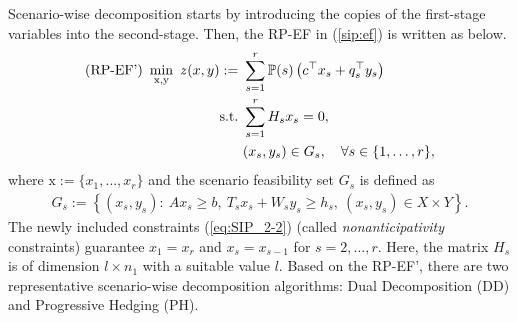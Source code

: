Scenario-wise decomposition starts by introducing the copies of the first-stage variables into the second-stage. Then, the RP-EF in (\ref{sip:ef}) is written as below.
\begin{subequations} \label{sip:ef'}
	\begin{align}
	\textrm{(RP-EF') }\min_{\mathrm{x},\mathrm{y}}\ z(x,y):=\ &\sum_{s=1}^{r}\PP(s)\left(c^{\top}x_s+q_s^{\top}y_s\right)	\label{eq:SIP_2-1}\\ 
	\mathrm{s.t.}\ &\sum_{s=1}^{r}H_s x_s=0, \label{eq:SIP_2-2} \\
	\ &(x_s,y_s)\in G_s,\quad \forall s\in\{1,\ldots,r\},	\label{eq:SIP_2-3}
	\end{align}
\end{subequations}
where $\mathrm{x}:=\{x_1,\ldots,x_r\}$ and the scenario feasibility set $G_s$ is defined as
\begin{align} 
G_s:=\left\{ (x_s,y_s): \ Ax_s\ge b,\  T_s x_s+W_s y_s\ge h_s,\ (x_s,y_s)\in X\times Y  \right\}. \label{eq:SIP_2-4}
\end{align}
The newly included constraints (\ref{eq:SIP_2-2}) (called \textit{nonanticipativity} constraints) guarantee $x_1=x_r$ and $x_s=x_{s-1}$ for $s=2,\ldots,r$. Here, the matrix $H_s$ is of dimension $l\times n_1$ with a suitable value $l$. %
Based on the RP-EF', there are two representative scenario-wise decomposition algorithms: Dual Decomposition (DD) and Progressive Hedging (PH). 


